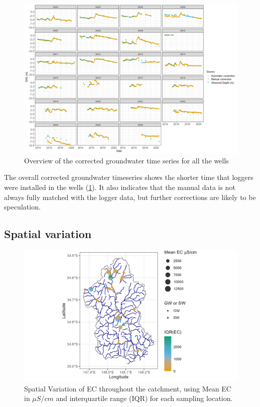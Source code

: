 \documentclass[, manuscript]{copernicus}
\begin{document}
\begin{figure}
\includegraphics[width=1\linewidth]{Figures/Final_Corrected_piezodepths} \caption{Overview of the corrected groundwater time series for all the wells}\label{fig:gw-series}
\end{figure}

The overall corrected groundwater timeseries shows the shorter time that
loggers were installed in the wells (\ref{fig:gw-series}). It also
indicates that the manual data is not always fully matched with the
logger data, but further corrections are likely to be speculation.

\subsection{Spatial variation}

\begin{figure}
\includegraphics[width=0.8\linewidth]{Figures/ec_map} \caption{Spatial Variation of EC throughout the catchment, using Mean EC in $\mu S/cm$ and interquartile range (IQR) for each sampling location. }\label{fig:ECmap}
\end{figure}
\end{document}
